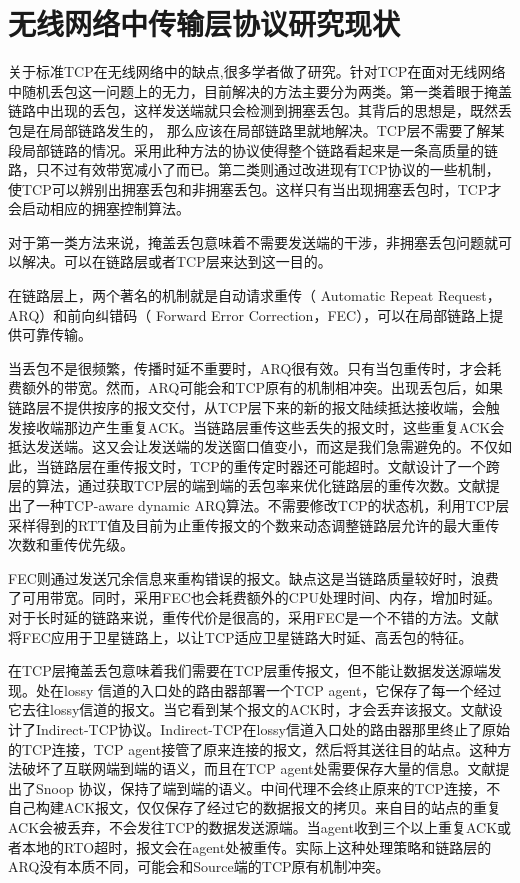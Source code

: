 \section{无线网络中传输层协议研究现状}
\par
关于标准TCP在无线网络中的缺点,很多学者做了研究\textsuperscript{\cite{Balakrishnan1997,ontcp,YE2005,tcpsatelite,OpenIssues}}。针对TCP在面对无线网络中随机丢包这一问题上的无力，目前解决的方法主要分为两类。第一类着眼于掩盖链路中出现的丢包，这样发送端就只会检测到拥塞丢包。其背后的思想是，既然丢包是在局部链路发生的， 那么应该在局部链路里就地解决。TCP层不需要了解某段局部链路的情况。采用此种方法的协议使得整个链路看起来是一条高质量的链路，只不过有效带宽减小了而已。第二类则通过改进现有TCP协议的一些机制，使TCP可以辨别出拥塞丢包和非拥塞丢包。这样只有当出现拥塞丢包时，TCP才会启动相应的拥塞控制算法。
\par
对于第一类方法来说，掩盖丢包意味着不需要发送端的干涉，非拥塞丢包问题就可以解决。可以在链路层或者TCP层来达到这一目的。
\par
在链路层上，两个著名的机制就是自动请求重传（ Automatic Repeat Request，ARQ）和前向纠错码（ Forward Error Correction，FEC），可以在局部链路上提供可靠传输\textsuperscript{\cite{1607897,1599400,1603715}}。
\par
当丢包不是很频繁，传播时延不重要时，ARQ很有效。只有当包重传时，才会耗费额外的带宽。然而，ARQ可能会和TCP原有的机制相冲突\textsuperscript{\cite{Balakrishnan1997}}。出现丢包后，如果链路层不提供按序的报文交付，从TCP层下来的新的报文陆续抵达接收端，会触发接收端那边产生重复ACK。当链路层重传这些丢失的报文时，这些重复ACK会抵达发送端。这又会让发送端的发送窗口值变小，而这是我们急需避免的。不仅如此，当链路层在重传报文时，TCP的重传定时器还可能超时。文献\cite{Vacirca2003On}设计了一个跨层的算法，通过获取TCP层的端到端的丢包率来优化链路层的重传次数。文献\cite{crosslayer}提出了一种TCP-aware dynamic ARQ算法。不需要修改TCP的状态机，利用TCP层采样得到的RTT值及目前为止重传报文的个数来动态调整链路层允许的最大重传次数和重传优先级。
\par
FEC则通过发送冗余信息来重构错误的报文。缺点这是当链路质量较好时，浪费了可用带宽。同时，采用FEC也会耗费额外的CPU处理时间、内存，增加时延。对于长时延的链路来说，重传代价是很高的，采用FEC是一个不错的方法。文献\cite{Allman1999Enhancing}将FEC应用于卫星链路上，以让TCP适应卫星链路大时延、高丢包的特征。
\par
在TCP层掩盖丢包意味着我们需要在TCP层重传报文，但不能让数据发送源端发现。处在lossy 信道的入口处的路由器部署一个TCP agent，它保存了每一个经过它去往lossy信道的报文。当它看到某个报文的ACK时，才会丢弃该报文。文献\cite{Bakre1995I}设计了Indirect-TCP协议。Indirect-TCP在lossy信道入口处的路由器那里终止了原始的TCP连接，TCP agent接管了原来连接的报文，然后将其送往目的站点。这种方法破坏了互联网端到端的语义，而且在TCP agent处需要保存大量的信息。文献\cite{Balakrishnan1995Improving}提出了Snoop 协议，保持了端到端的语义。中间代理不会终止原来的TCP连接，不自己构建ACK报文，仅仅保存了经过它的数据报文的拷贝。来自目的站点的重复ACK会被丢弃，不会发往TCP的数据发送源端。当agent收到三个以上重复ACK或者本地的RTO超时，报文会在agent处被重传。实际上这种处理策略和链路层的ARQ没有本质不同，可能会和Source端的TCP原有机制冲突。
